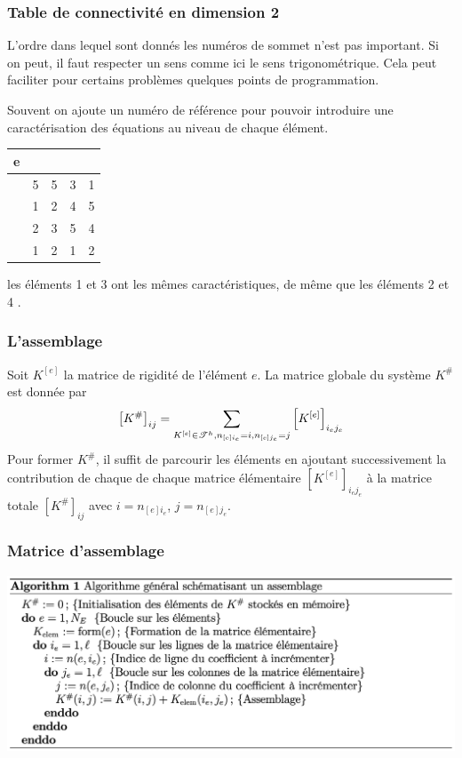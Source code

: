 \documentclass{beamer}
\begin{document}
\begin{frame}
\frametitle{Table de connectivité en dimension 2}
L'ordre dans lequel sont donnés les numéros de sommet n'est pas important. Si on peut, il faut respecter un sens comme ici le sens trigonométrique. Cela peut faciliter pour certains problèmes quelques points de programmation.

Souvent on ajoute un numéro de référence pour pouvoir introduire une caractérisation des équations au niveau de chaque élément.

\begin{center}
\begin{tabular}{|c|c|c|c|c|}\hline 
{\bf e} &\bf \color{blue}{1} & \bf \color{blue}{2}  & \bf \color{blue}{3} & \bf \color{blue}{4}  \\ \hline 
\bf \color{red}{1} & 5 & 5 & 3 & 1\\ \hline 
\bf \color{red}{2}& 1 & 2 & 4 & 5\\ \hline 
\bf \color{red}{3}& 2 & 3 & 5 & 4 \\ \hline \hline 
\bf \color{green}{4}& 1 & 2 & 1 & 2\\ \hline 
\end{tabular} 
\end{center}
les éléments 1 et 3 ont les mêmes caractéristiques, de même que les éléments 2 et 4 .
\end{frame}
\begin{frame}
\frametitle{L'assemblage}
Soit $K^{[e]}$ la matrice de rigidité de l'élément $e$. La matrice globale du système $K^{\#}$  est donnée par
\[ \left[K^{\#}\right]_{ij}=\sum_{K^{[e]} \in{\cal T}^h, n_{[e]i_e}=i,n_{[e]j_e}=j}\left[K^{[e]}\right]_{i_ej_e} \]
Pour former $K^{\#}$, il suffit de parcourir les éléments en ajoutant successivement la contribution de chaque de chaque matrice élémentaire $\left[K^{[e]}\right]_{i_ej_e} $ à la matrice totale $\left[K^{\#}\right]_{ij}$ avec $i=n_{[e]i_e}$, $j=n_{[e]j_e}$.
\end{frame}

\begin{frame}
\frametitle{Matrice d'assemblage}

\begin{center}
\includegraphics[scale=0.35]{algorithmeAssemblage.png} 
\end{center}
\end{frame}
\end{document}
